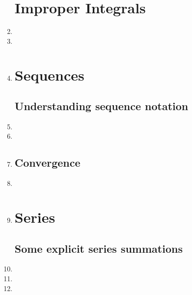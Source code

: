 \documentclass{article}
\begin{document}
\begin{enumerate}
\section{Improper Integrals}
\item 

\item 

\item 

\section{Sequences}
\subsection{Understanding sequence notation}
\item 

\item 

\item 


\subsection{Convergence}
\item 

\item 

\section{Series}
\subsection{Some explicit series summations}
\item 
\item 
\item 



\end{enumerate}
\end{document}

